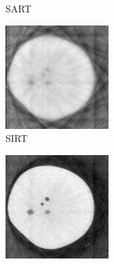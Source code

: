 \documentclass[journal]{IEEEtran}
\begin{document}
\begin{figure}[!h]
\begin{subfigure}[b]{0.24\linewidth}
        \caption{SART}
     \end{subfigure}
    \begin{subfigure}[b]{0.24\linewidth}
        \includegraphics[width=\textwidth]{../images/potato/2D/sirt.png}
        \caption{SIRT}
     \end{subfigure}
    \begin{subfigure}[b]{0.24\linewidth}
        \includegraphics[width=\textwidth]{../images/potato/2D/weighted_pca_all_methods30.png}

\end{subfigure}
\end{figure}
\end{document}

